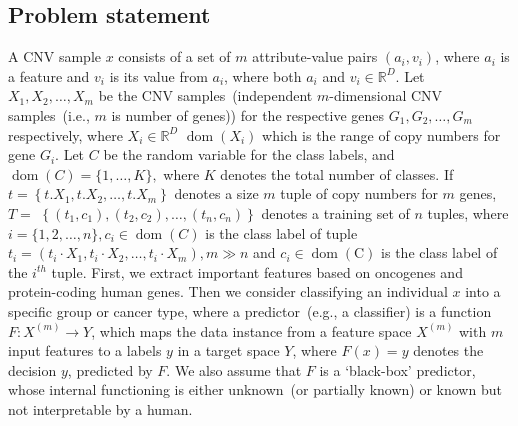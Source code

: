 \subsection{Problem statement}
A CNV sample $x$ consists of a set of $m$ attribute-value pairs $\left(a_{i}, v_{i}\right)$, where $a_i$ is a feature and $v_i$ is its value from $a_{i}$, where both $a_{i}$ and $v_i \in \mathbb{R}^{D}$. %
Let $X_{1}, X_{2}, \ldots, X_{m}$ be the CNV samples~(independent $m$-dimensional CNV samples~(i.e., $m$ is number of genes)) for the respective genes $G_{1}, G_{2}, \ldots, G_{m}$ respectively, where $X_{i} \in \mathbb{R}^{D}$ $\operatorname{dom}\left(X_{i}\right)$ which is the range of copy numbers for gene $G_{i}$. Let $C$ be the random variable for the class labels, and $\operatorname{dom}(C)=\{1, \ldots, K\},$ where $K$ denotes the total number of classes. If $t=\left\{t . X_{1}, t . X_{2}, \ldots, t . X_{m}\right\}$ denotes a size $m$ tuple of copy numbers for $m$ genes, $T=$ $\left\{\left(t_{1}, c_{1}\right),\left(t_{2}, c_{2}\right), \ldots,\left(t_{n}, c_{n}\right)\right\}$ denotes a training set of $n$ tuples, where $i=\{1,2, \ldots, n\}, c_{i} \in \operatorname{dom}(C)$ is the class label of tuple $t_{i} 
=\left(t_{i} \cdot X_{1}, t_{i} \cdot X_{2}, \ldots, t_{i} \cdot X_{m}\right), m \gg n$ and $c_{i} \in \operatorname{dom}(\mathrm{C})$ is the class label of the $i^{th}$ tuple. 
First, we extract important features based on oncogenes and protein-coding human genes. 
Then we consider classifying an individual $x$ into a specific group or cancer type, where a predictor~(e.g., a classifier) is a function $F: {X}^{(m)} \rightarrow {Y}$, which maps the data instance from a feature space ${X}^{(m)}$ with $m$ input features to a labels $y$ in a target space ${Y}$, where $F(x)=y$ denotes the decision $y$, predicted by $F$. We also assume that $F$ is a `black-box' predictor, whose internal functioning is either unknown~(or partially known) or known but not interpretable by a human. 
 
